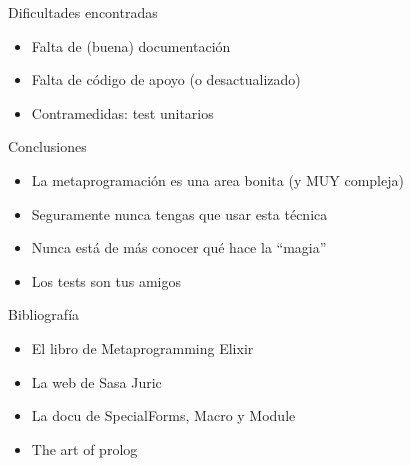 \documentclass[14pt,aspectratio=169]{beamer}
\begin{document}
\begin{frame}{Dificultades encontradas}
  \begin{itemize}
    \item Falta de (buena) documentación
    \item Falta de código de apoyo (o desactualizado)
    \item Contramedidas: test unitarios
  \end{itemize}
\end{frame}

\begin{frame}{Conclusiones}
  \begin{itemize}
    \item La metaprogramación es una area bonita (y MUY compleja)
    \item Seguramente nunca tengas que usar esta técnica
    \item Nunca está de más conocer qué hace la ``magia''
    \item Los tests son tus amigos
  \end{itemize}
\end{frame}

\begin{frame}{Bibliografía}
  \begin{itemize}
    \item El libro de Metaprogramming Elixir
    \item La web de Sasa Juric
    \item La docu de SpecialForms, Macro y Module
    \item The art of prolog
  \end{itemize}
\end{frame}
\end{document}
